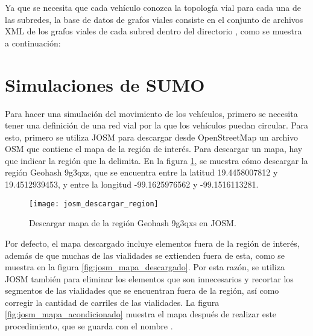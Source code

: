 Ya que se necesita que cada vehículo conozca la topología vial para cada una de
las subredes, la base de datos de grafos viales consiste en el conjunto de
archivos XML de los grafos viales de cada subred dentro del directorio
, como se muestra a continuación:



\section{Simulaciones de SUMO}

\label{sec:simulaciones_sumo}

Para hacer una simulación del movimiento de los vehículos, primero se necesita
tener una definición de una red vial por la que los vehículos puedan circular.
Para esto, primero se utiliza JOSM para descargar desde OpenStreetMap un
archivo OSM que contiene el mapa de la región de interés. Para descargar un
mapa, hay que indicar la región que la delimita. En la figura
\ref{fig:josm_descargar_region}, se muestra cómo descargar la región Geohash
9g3qxs, que se encuentra entre la latitud 19.4458007812 y 19.4512939453, y
entre la longitud -99.1625976562 y -99.1516113281.

\begin{figure}[th!]
\centering
\texttt{[image: josm\_descargar\_region]}
\decoRule
\caption[Descargar mapa de la región Geohash 9g3qxs en JOSM]{Descargar mapa de
la región Geohash 9g3qxs en JOSM.}
\label{fig:josm_descargar_region}
\end{figure}

Por defecto, el mapa descargado incluye elementos fuera de la región de
interés, además de que muchas de las vialidades se extienden fuera de esta,
como se muestra en la figura \ref{fig:josm_mapa_descargado}. Por esta razón, se
utiliza JOSM también para eliminar los elementos que son innecesarios y
recortar los segmentos de las vialidades que se encuentran fuera de la región,
así como corregir la cantidad de carriles de las vialidades. La figura
\ref{fig:josm_mapa_acondicionado} muestra el mapa después de realizar este
procedimiento, que se guarda con el nombre .

